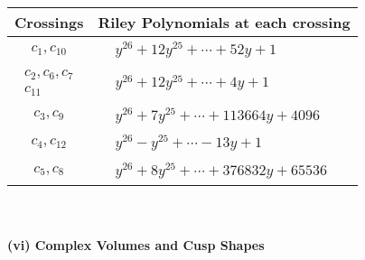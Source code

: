 \documentclass[1p]{elsarticle_modified}
\theoremstyle{definition}
\begin{document}
\begin{tabular}{m{50pt}|m{274pt}}
Crossings & \hspace{64pt}Riley Polynomials at each crossing \\
\hline $$\begin{aligned}c_{1},c_{10}\end{aligned}$$&$\begin{aligned}
&y^{26}+12 y^{25}+\cdots+52 y+1
\end{aligned}$\\
\hline $$\begin{aligned}c_{2},c_{6},c_{7}\\c_{11}\end{aligned}$$&$\begin{aligned}
&y^{26}+12 y^{25}+\cdots+4 y+1
\end{aligned}$\\
\hline $$\begin{aligned}c_{3},c_{9}\end{aligned}$$&$\begin{aligned}
&y^{26}+7 y^{25}+\cdots+113664 y+4096
\end{aligned}$\\
\hline $$\begin{aligned}c_{4},c_{12}\end{aligned}$$&$\begin{aligned}
&y^{26}- y^{25}+\cdots-13 y+1
\end{aligned}$\\
\hline $$\begin{aligned}c_{5},c_{8}\end{aligned}$$&$\begin{aligned}
&y^{26}+8 y^{25}+\cdots+376832 y+65536
\end{aligned}$\\
\hline
\end{tabular}\\~\\
\newpage\flushleft \textbf{(vi) Complex Volumes and Cusp Shapes}
\end{document}
